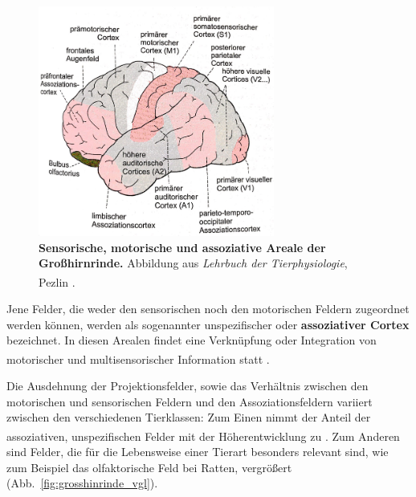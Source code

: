 \documentclass[12pt,a4paper,pdftex]{article}
\begin{document}
\begin{figure}[H]
    \centering
    \includegraphics[width=0.69\textwidth]{pictures/Bilder_Jule/Andere/Grosshirnrinde_sensorik_motorik.png}
    \caption[Sensorische, motorische und assoziative Areale der Großhirnrinde]{\textbf{Sensorische, motorische und assoziative Areale der Großhirnrinde.} Abbildung aus \textit{Lehrbuch der Tierphysiologie}, Pezlin \textsuperscript{\cite[14]{penzlin2005tierphys}}.}
    \label{fig:grosshirnrinde_sensorik_motorik}
\end{figure}

\noindent Jene Felder, die weder den sensorischen noch den motorischen Feldern zugeordnet werden können, werden als sogenannter unspezifischer oder \textbf{assoziativer Cortex} bezeichnet. In diesen Arealen findet eine Verknüpfung oder Integration von motorischer und multisensorischer Information statt \textsuperscript{\cite[14]{penzlin2005tierphys}}. 

\noindent Die Ausdehnung der Projektionsfelder, sowie das Verhältnis zwischen den motorischen und sensorischen Feldern und den Assoziationsfeldern variiert zwischen den verschiedenen Tierklassen: Zum Einen nimmt der Anteil der assoziativen, unspezifischen Felder mit der Höherentwicklung zu \textsuperscript{\cite[14]{penzlin2005tierphys}}. Zum Anderen sind Felder, die für die Lebensweise einer Tierart besonders relevant sind, wie zum Beispiel das olfaktorische Feld bei Ratten, vergrößert (Abb.~\ref{fig:grosshinrinde_vgl}).
\end{document}
